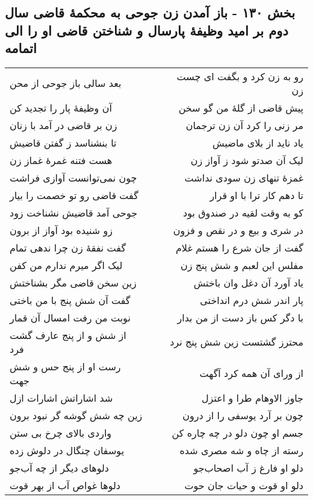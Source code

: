 \begin{center}
\section*{بخش ۱۳۰ - باز آمدن زن جوحی به محکمهٔ قاضی سال دوم بر امید وظیفهٔ پارسال و شناختن قاضی او را الی اتمامه}
\label{sec:sh130}
\begin{longtable}{l p{0.5cm} r}
بعد سالی باز جوحی از محن
&&
رو به زن کرد و بگفت ای چست زن
\\
آن وظیفهٔ پار را تجدید کن
&&
پیش قاضی از گلهٔ من گو سخن
\\
زن بر قاضی در آمد با زنان
&&
مر زنی را کرد آن زن ترجمان
\\
تا بنشناسد ز گفتن قاضیش
&&
یاد ناید از بلای ماضیش
\\
هست فتنه غمرهٔ غماز زن
&&
لیک آن صدتو شود ز آواز زن
\\
چون نمی‌توانست آوازی فراشت
&&
غمزهٔ تنهای زن سودی نداشت
\\
گفت قاضی رو تو خصمت را بیار
&&
تا دهم کار ترا با او قرار
\\
جوحی آمد قاضیش نشناخت زود
&&
کو به وقت لقیه در صندوق بود
\\
زو شنیده بود آواز از برون
&&
در شری و بیع و در نقص و فزون
\\
گفت نفقهٔ زن چرا ندهی تمام
&&
گفت از جان شرع را هستم غلام
\\
لیک اگر میرم ندارم من کفن
&&
مفلس این لعبم و شش پنج زن
\\
زین سخن قاضی مگر بشناختش
&&
یاد آورد آن دغل وان باختش
\\
گفت آن شش پنج با من باختی
&&
پار اندر شش درم انداختی
\\
نوبت من رفت امسال آن قمار
&&
با دگر کس باز دست از من بدار
\\
از شش و از پنج عارف گشت فرد
&&
محترز گشتست زین شش پنج نرد
\\
رست او از پنج حس و شش جهت
&&
از ورای آن همه کرد آگهت
\\
شد اشاراتش اشارات ازل
&&
جاوز الاوهام طرا و اعتزل
\\
زین چه شش گوشه گر نبود برون
&&
چون بر آرد یوسفی را از درون
\\
واردی بالای چرخ بی ستن
&&
جسم او چون دلو در چه چاره کن
\\
یوسفان چنگال در دلوش زده
&&
رسته از چاه و شه مصری شده
\\
دلوهای دیگر از چه آب‌جو
&&
دلو او فارغ ز آب اصحاب‌جو
\\
دلوها غواص آب از بهر قوت
&&
دلو او قوت و حیات جان حوت
\\

\end{longtable}
\end{center}
